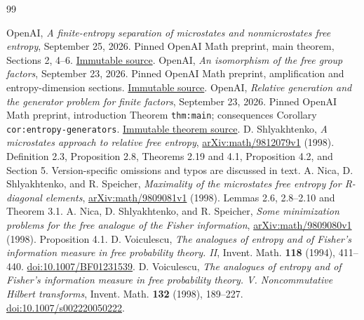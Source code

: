 \documentclass[11pt]{article}
\theoremstyle{definition}\newtheorem{definition}[theorem]{Definition}
\theoremstyle{remark}\newtheorem{remark}[theorem]{Remark}
\begin{document}
\begin{thebibliography}{99}
\raggedright
{} OpenAI,
\emph{A finite-entropy separation of microstates and nonmicrostates free
entropy}, September 25, 2026. Pinned OpenAI Math preprint, main theorem,
Sections 2, 4--6.
\href{https://github.com/openai/math/blob/fd4aeeb2ee4fc729c18d98444fed42fd0529eeeb/preprints/A-finite-entropy-separation-of-microstates-and-nonmicrostates-free-entropy-September-25-2026/build/paper.tex}{Immutable source}.
 OpenAI,
\emph{An isomorphism of the free group factors}, September 23, 2026.
Pinned OpenAI Math preprint, amplification and entropy-dimension sections.
\href{https://github.com/openai/math/blob/fd4aeeb2ee4fc729c18d98444fed42fd0529eeeb/preprints/An-isomorphism-of-the-free-group-factors-September-23-2026/build/main.tex}{Immutable source}.
 OpenAI,
\emph{Relative generation and the generator problem for finite factors},
September 23, 2026. Pinned OpenAI Math preprint, introduction
Theorem \texttt{thm:main}; consequences Corollary
\texttt{cor:entropy-generators}.
\href{https://github.com/openai/math/blob/fd4aeeb2ee4fc729c18d98444fed42fd0529eeeb/preprints/Relative-generation-and-the-generator-problem-for-finite-factors-September-23-2026/build/sections/introduction.tex}{Immutable theorem source}.
 D. Shlyakhtenko,
\emph{A microstates approach to relative free entropy},
\href{https://arxiv.org/abs/math/9812079v1}{arXiv:math/9812079v1} (1998).
Definition 2.3, Proposition 2.8, Theorems 2.19 and 4.1, Proposition 4.2,
and Section 5. Version-specific omissions and typos are discussed in text.
 A. Nica, D. Shlyakhtenko, and R. Speicher,
\emph{Maximality of the microstates free entropy for R-diagonal elements},
\href{https://arxiv.org/abs/math/9809081v1}{arXiv:math/9809081v1} (1998).
Lemmas 2.6, 2.8--2.10 and Theorem 3.1.
 A. Nica, D. Shlyakhtenko, and R. Speicher,
\emph{Some minimization problems for the free analogue of the Fisher
information},
\href{https://arxiv.org/abs/math/9809080v1}{arXiv:math/9809080v1} (1998).
Proposition 4.1.
 D. Voiculescu,
\emph{The analogues of entropy and of Fisher's information measure in
free probability theory. II}, Invent. Math. \textbf{118} (1994), 411--440.
\href{https://doi.org/10.1007/BF01231539}{doi:10.1007/BF01231539}.
 D. Voiculescu,
\emph{The analogues of entropy and of Fisher's information measure in
free probability theory. V. Noncommutative Hilbert transforms},
Invent. Math. \textbf{132} (1998), 189--227.
\href{https://doi.org/10.1007/s002220050222}{doi:10.1007/s002220050222}.

\end{thebibliography}
\end{document}
